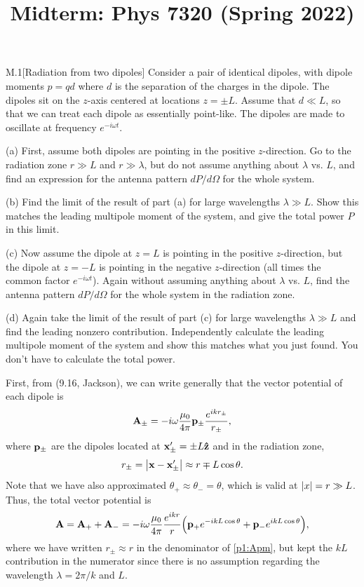 \documentclass[12pt]{article}
\title{Midterm: Phys 7320 (Spring 2022)}
\begin{document}
\maketitle
\begin{problem}{M.1}[Radiation from two dipoles]
Consider a pair of identical dipoles, with dipole moments $p=qd$ where $d$ is
the separation of the charges in the dipole. The dipoles sit on the $z$-axis
centered at locations $z=\pm L$. Assume that $d\ll L$, so that we can treat each
dipole as essentially point-like. The dipoles are made to oscillate at frequency
$e^{-i\omega t}$.

(a) First, assume both dipoles are pointing in the positive $z$-direction. Go to
the radiation zone $r\gg L$ and $r\gg \lambda$, but do not assume anything about
$\lambda$ vs. $L$, and find an expression for the antenna pattern $dP/d\Omega$
for the whole system.

(b) Find the limit of the result of part (a) for large wavelengths $\lambda\gg
L$. Show this matches the leading multipole moment of the system, and give the
total power $P$ in this limit.

(c) Now assume the dipole at $z=L$ is pointing in the positive $z$-direction,
but the dipole at $z=-L$ is pointing in the negative $z$-direction (all times
the common factor $e^{-i\omega t}$). Again without assuming anything about
$\lambda$ vs. $L$, find the antenna pattern $dP/d\Omega$ for the whole system in
the radiation zone.

(d) Again take the limit of the result of part (c) for large wavelengths
$\lambda\gg L$ and find the leading nonzero contribution. Independently
calculate the leading multipole moment of the system and show this matches what
you just found. You don't have to calculate the total power.
\begin{solution}
First, from (9.16, Jackson), we can write generally that the vector potential 
of each dipole is
\begin{equation}\label{p1:Apm}
    \vb{A}_\pm=-i\omega\frac{\mu_0}{4\pi}\vb{p}_\pm\frac{e^{ikr_\pm}}{r_\pm}, 
\end{equation}
where $\vb{p}_\pm$ are the dipoles located at $\vb{x}'_\pm=\pm L\vb{\hat{z}}$ and in
the radiation zone,
\begin{equation}
    r_\pm=\abs{\vb{x}-\vb{x}'_\pm}\approx r\mp L\cos\theta.
\end{equation}
Note that we have also approximated $\theta_+\approx\theta_-=\theta$, which is
valid at $\abs{x}=r\gg L$. Thus, the total vector potential is
\begin{equation}\label{p1:A}
    \vb{A}=\vb{A}_++\vb{A}_-=-i\omega\frac{\mu_0}{4\pi}\frac{e^{ikr}}{r}
    \qty(\vb{p}_+e^{-ikL\cos\theta}+\vb{p}_-e^{ikL\cos\theta}),
\end{equation}
where we have written $r_\pm\approx r$ in the denominator of \cref{p1:Apm}, but
kept the $kL$ contribution in the numerator since there is no assumption
regarding the wavelength $\lambda=2\pi/k$ and $L$.


\end{solution}
\end{problem}
\end{document}
